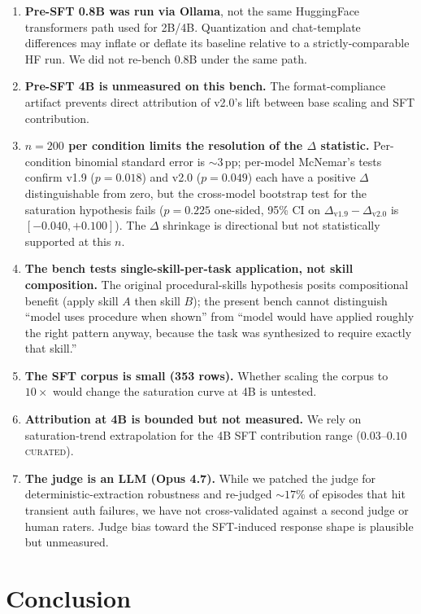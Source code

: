 \documentclass[10pt]{article}
\newcommand{\CU}{\textsc{curated}\xspace}
\begin{document}
\begin{enumerate}[leftmargin=*]
  \item \textbf{Pre-SFT 0.8B was run via Ollama}, not the same HuggingFace transformers path used for 2B/4B. Quantization and chat-template differences may inflate or deflate its baseline relative to a strictly-comparable HF run. We did not re-bench 0.8B under the same path.
  \item \textbf{Pre-SFT 4B is unmeasured on this bench.} The format-compliance artifact prevents direct attribution of v2.0's lift between base scaling and SFT contribution.
  \item \textbf{$n{=}200$ per condition limits the resolution of the $\Delta$ statistic.} Per-condition binomial standard error is $\sim\!3$\,pp; per-model McNemar's tests confirm v1.9 ($p{=}0.018$) and v2.0 ($p{=}0.049$) each have a positive $\Delta$ distinguishable from zero, but the cross-model bootstrap test for the saturation hypothesis fails ($p{=}0.225$ one-sided, 95\% CI on $\Delta_{\mathrm{v1.9}} - \Delta_{\mathrm{v2.0}}$ is $[-0.040, +0.100]$). The $\Delta$ shrinkage is directional but not statistically supported at this $n$.
  \item \textbf{The bench tests single-skill-per-task application, not skill composition.} The original procedural-skills hypothesis posits compositional benefit (apply skill $A$ then skill $B$); the present bench cannot distinguish ``model uses procedure when shown'' from ``model would have applied roughly the right pattern anyway, because the task was synthesized to require exactly that skill.''
  \item \textbf{The SFT corpus is small (353 rows).} Whether scaling the corpus to $10\times$ would change the saturation curve at 4B is untested.
  \item \textbf{Attribution at 4B is bounded but not measured.} We rely on saturation-trend extrapolation for the 4B SFT contribution range ($0.03$--$0.10$ \CU).
  \item \textbf{The judge is an LLM (Opus 4.7).} While we patched the judge for deterministic-extraction robustness and re-judged $\sim\!17\%$ of episodes that hit transient auth failures, we have not cross-validated against a second judge or human raters. Judge bias toward the SFT-induced response shape is plausible but unmeasured.
\end{enumerate}

\section{Conclusion}
\end{document}
